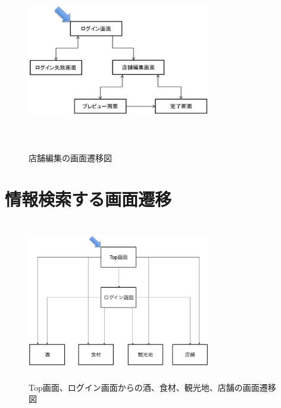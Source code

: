 \documentclass[a4j,titlepage]{jarticle}
\begin{document}
\begin {figure}[!htbp]
    \begin{center}
    \includegraphics [height=8cm, width=8cm]{tere.eps}
    \caption {店舗編集の画面遷移図}
    \label {fig:tere}
    \end{center}
\end {figure}


\clearpage


\section{情報検索する画面遷移}

\begin {figure}[!htbp]
    \begin{center}
    \includegraphics [height=7cm, width=8cm]{top.eps}
    \caption {Top画面、ログイン画面からの酒、食材、観光地、店舗の画面遷移図}
    \label {fig:top}
    \end{center}
\end {figure}
\end{document}
